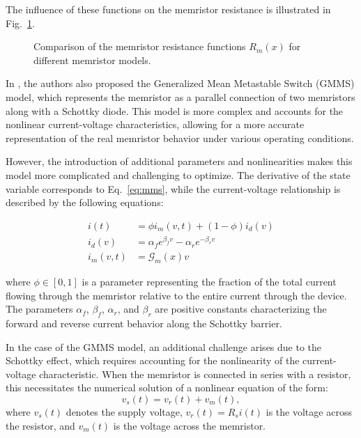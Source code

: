 \documentclass[11pt, oneside]{article}
\newcommand{\G}{\mathcal{G}}
\begin{document}
The influence of these functions on the memristor resistance is illustrated in Fig.~\ref{fig:m-x}.

\begin{figure}[H]
    \centering
    \resizebox{0.5\linewidth}{!}{%
        
    }
    \caption{Comparison of the memristor resistance functions $R_m(x)$ for different memristor models.}
    \label{fig:m-x}
\end{figure}

In \cite{Molter2016}, the authors also proposed the Generalized Mean Metastable Switch (GMMS) model, which represents the memristor as a parallel connection of two memristors along with a Schottky diode. This model is more complex and accounts for the nonlinear current-voltage characteristics, allowing for a more accurate representation of the real memristor behavior under various operating conditions.

However, the introduction of additional parameters and nonlinearities makes this model more complicated and challenging to optimize. The derivative of the state variable corresponds to Eq.~\eqref{eq:mms}, while the current-voltage relationship is described by the following equations:

\begin{align}
    i(t)      & = \phi i_m(v, t) + (1-\phi) i_d(v)                 \\
    i_d(v)    & = \alpha_f e^{\beta_f v} - \alpha_r e^{-\beta_r v} \\
    i_m(v, t) & = \G_m(x) v
\end{align}

where $\phi \in [0,1]$ is a parameter representing the fraction of the total current flowing through the memristor relative to the entire current through the device. The parameters $\alpha_f$, $\beta_f$, $\alpha_r$, and $\beta_r$ are positive constants characterizing the forward and reverse current behavior along the Schottky barrier.


In the case of the GMMS model, an additional challenge arises due to the Schottky effect, which requires accounting for the nonlinearity of the current-voltage characteristic. When the memristor is connected in series with a resistor, this necessitates the numerical solution of a nonlinear equation of the form:
\begin{equation}
    v_s(t) = v_r(t) + v_m(t),
\end{equation}
where $v_s(t)$ denotes the supply voltage, $v_r(t) = R_s i(t)$ is the voltage across the resistor, and $v_m(t)$ is the voltage across the memristor.
\end{document}
